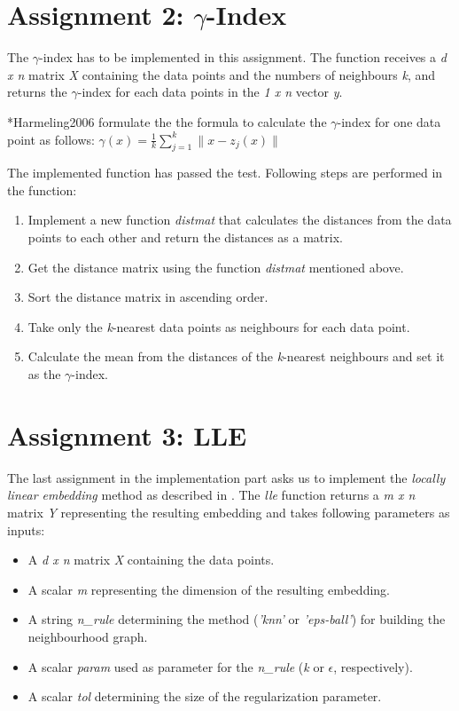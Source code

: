 \section{Assignment 2: $\gamma$-Index}
\label{sec:assignment2}

The $\gamma$-index has to be implemented in this assignment. The function receives a \textit{d x n} matrix \textit{X} containing the data points and the numbers of neighbours \textit{k}, and returns the $\gamma$-index for each data points in the \textit{1 x n} vector \textit{y}.

\citeasnoun**{Harmeling2006} formulate the the formula to calculate the $\gamma$-index for one data point as follows:
$\gamma(x)=\frac{1}{k} \sum_{j=1}^{k} \| x-z_j(x) \|$

The implemented function has passed the test. Following steps are performed in the function:
\begin{enumerate}
	\item Implement a new function \textit{distmat} that calculates the distances from the data points to each other and return the distances as a matrix.
	\item Get the distance matrix using the function \textit{distmat} mentioned above.
	\item Sort the distance matrix in ascending order.
	\item Take only the \textit{k}-nearest data points as neighbours for each data point.
	\item Calculate the mean from the distances of the \textit{k}-nearest neighbours and set it as the $\gamma$-index.
	
\end{enumerate}


\section{Assignment 3: LLE}
\label{sec:assignment3}

The last assignment in the implementation part asks us to implement the \textit{locally linear embedding} method as described in \cite{Saul2000}. The \textit{lle} function returns a \textit{m x n} matrix \textit{Y} representing the resulting embedding and takes following parameters as inputs:
\begin{itemize}
	\item A \textit{d x n} matrix \textit{X} containing the data points.
	\item A scalar \textit{m} representing the dimension of the resulting embedding.
	\item A string \textit{n\_rule} determining the method (\textit{'knn'} or \textit{'eps-ball'}) for building the neighbourhood graph.
	\item A scalar \textit{param} used as parameter for the \textit{n\_rule} (\textit{k} or $\epsilon$, respectively).
	\item A scalar \textit{tol} determining the size of the regularization parameter.
\end{itemize}

